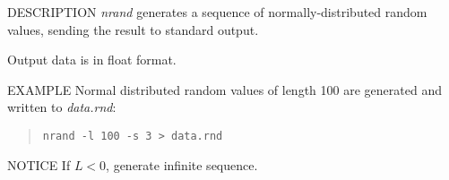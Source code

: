 \begin{synopsis}
\item[nrand] [ --l $L$ ] [ --s $S$ ] [ --m $M$ ] [ --v $V$ ] [ --d $D$ ]
\end{synopsis}

\begin{qsection}{DESCRIPTION}
{\em nrand} generates a sequence of normally-distributed random values,
sending the result to standard output.

Output data is in float format.
\end{qsection}

\begin{options} 
\end{options}

\begin{qsection}{EXAMPLE}
Normal distributed random values of length 100 are generated
and written to {\em data.rnd}:
\begin{quote}
\verb!nrand -l 100 -s 3 > data.rnd!
\end{quote}
\end{qsection}

\begin{qsection}{NOTICE}
If $L<0$, generate infinite sequence.
\end{qsection}
